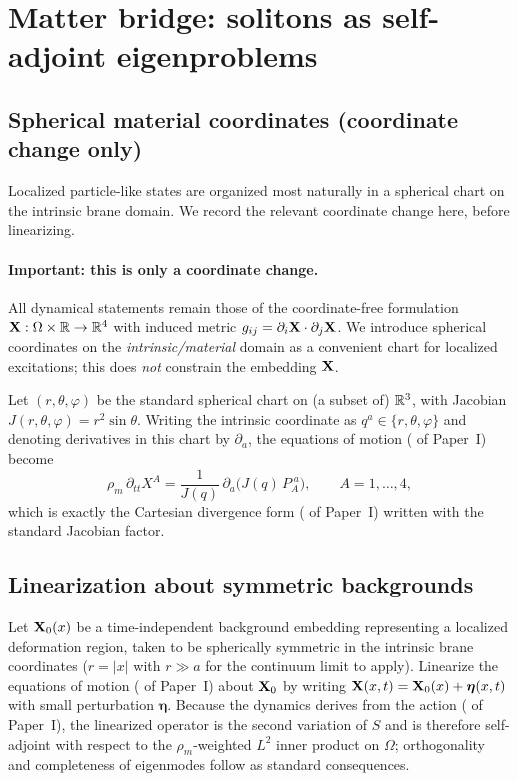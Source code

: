 \section{Matter bridge: solitons as self-adjoint eigenproblems}
\label{sec:matter}

\subsection{Spherical material coordinates (coordinate change only)}
\label{subsec:spherical-material-coords}

Localized particle-like states are organized most naturally in a spherical chart on the
intrinsic brane domain. We record the relevant coordinate change here, before linearizing.

\paragraph{Important: this is only a coordinate change.}
All dynamical statements remain those of the coordinate-free formulation
$\mathbf{X}:\Omega\times\mathbb{R}\to\mathbb{R}^4$ with induced metric $g_{ij}=\partial_i\mathbf{X}\cdot\partial_j\mathbf{X}$.
We introduce spherical coordinates on the \emph{intrinsic/material} domain as a convenient chart for localized
excitations; this does \emph{not} constrain the embedding $\mathbf{X}$.

Let $(r,\theta,\varphi)$ be the standard spherical chart on (a subset of) $\mathbb{R}^3$, with Jacobian
$J(r,\theta,\varphi)=r^2\sin\theta$.
Writing the intrinsic coordinate as $q^a\in\{r,\theta,\varphi\}$ and denoting derivatives in this chart by $\partial_a$,
the equations of motion ( of Paper~I) become
\begin{equation}
  \rho_m\,\partial_{tt}X^A
  =\frac{1}{J(q)}\,\partial_a\!\Big(J(q)\,P_A^{\;a}\Big),
  \qquad A=1,\dots,4,
  \label{eq:eom-spherical}
\end{equation}
which is exactly the Cartesian divergence form ( of Paper~I) written with the standard Jacobian factor.

\subsection{Linearization about symmetric backgrounds}
\label{subsec:linearization}

Let $\mathbf{X}_0(x)$ be a time-independent background embedding representing a localized deformation
region, taken to be spherically symmetric in the intrinsic brane coordinates
($r=|x|$ with $r\gg a$ for the continuum limit to apply).
Linearize the equations of motion ( of Paper~I) about $\mathbf{X}_0$ by writing
$\mathbf{X}(x,t)=\mathbf{X}_0(x)+\bm{\eta}(x,t)$ with small perturbation $\bm{\eta}$.
Because the dynamics derives from the action ( of Paper~I), the linearized
operator is the second variation of $S$ and is therefore self-adjoint with respect to the
$\rho_m$-weighted $L^2$ inner product on $\Omega$; orthogonality and completeness of eigenmodes
follow as standard consequences.


